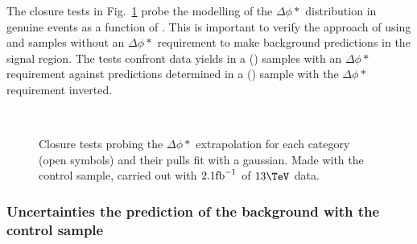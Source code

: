 The closure tests in Fig.~\ref{fig:closureBDPhi} probe the modelling
of the $\Delta\phi *$ distribution in genuine \met events as a
function of \scalht. This is important to verify the approach of using
\mj and \mmj samples without an $\Delta\phi *$ requirement to make
background predictions in the signal region. The tests confront data
yields in a \mj (\mmj) samples with an $\Delta\phi *$ requirement
against predictions determined in a \mj (\mmj) sample with the
$\Delta\phi *$ requirement inverted. 

\begin{figure}[h!]
  \begin{center}
    ~~
    \caption{Closure tests probing the $\Delta\phi *$ extrapolation for each
    \njet category (open symbols) and their pulls fit with a gaussian.
    Made with the \mj control sample, carried out with $2.1\ifb$ of
      $13\tev$ data. }
    \label{fig:closureBDPhi}
  \end{center} 
\end{figure}


\subsubsection{Uncertainties the prediction of the \znunu
background with the \mmj control sample}

